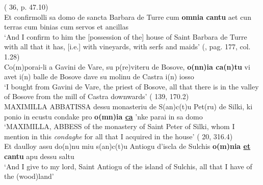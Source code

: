 \documentclass[output=paper,colorlinks,citecolor=brown]{langscibook}
\begin{document}
\ea\label{ex:men19}
    \ea\label{ex:men19a}(  36, p. 47.10)\\
     Et confirmolli sa domo de sancta Barbara de Turre cum \textbf{omnia cantu} aet cun terras cum binias cum servos et ancillas\\
    ‘And I confirm to him the [possession of the] house of Saint Barbara de Turre with all that it has, [i.e.] with vineyards, with serfs and maids’
    \ex\label{ex:men19b}(, pag. 177, col. 1.28)\\
     Co(m)porai-li a Gavini de Vare, su p(re)viteru de Bosove, \textbf{o(nn)ia ca(n)tu} vi avet i(n) balle de Bosove dave su molinu de Castra i(n) iosso\\
    ‘I bought from Gavini de Vare, the priest of Bosove, all that there is in the valley of Bosove from the mill of Castra downwards’
    \ex\label{ex:men19c}( 139, 170.2)\\
     MAXIMILLA ABBATISSA dessu monasteriu de S(an)c(t)u Pet(ru) de Silki, ki ponio in ecustu condake pro \textbf{o(mn)ia \ul{ca}} 'nke parai in sa domo\\
    ‘MAXIMILLA, ABBESS of the monastery of Saint Peter of Silki, whom I mention in this \textit{condaghe} for all that I acquired in the house’
    \ex\label{ex:men19d}( 20, 316.4)\\
     Et daulloy assu do(n)nu miu s(an)c(t)u Antiogu d'iscla de Sulchis \textbf{o(m)nia \ul{et} cantu} apu dessu saltu\\
    ‘And I give to my lord, Saint Antiogu of the island of Sulchis, all that I have of the (wood)land’
\z
\z
\end{document}
